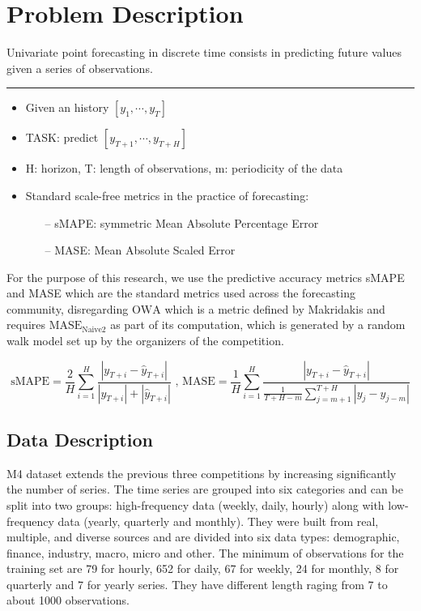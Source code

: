 \documentclass{article}
\begin{document}
\section{Problem Description}
\label{problemdescription}
Univariate point forecasting in discrete time consists in predicting future values given a series of observations.
\par\noindent\rule{\textwidth}{0.4pt}
\begin{itemize}
	\item Given an history $[ y_1, \cdots, y_T ]$
	\item TASK: predict $[y_{T+1}, \cdots , y_{T+H} ]$
	\item H: horizon, T: length of observations, m: periodicity of the data
	\item Standard scale-free metrics in the practice of forecasting:
	\begin{itemize}
			\item [--]  sMAPE: symmetric Mean Absolute Percentage Error
			\item [--]  MASE: Mean Absolute Scaled Error
	\end{itemize}
\end{itemize}

For the purpose of this research, we use the predictive accuracy metrics sMAPE and MASE which are the standard metrics used across the forecasting community, 
disregarding $\text{OWA}$ which is a metric defined by Makridakis and requires $\text{MASE}_{\text{Naive2}}$  as part of its computation, which is generated by a random walk model set up by the organizers of the competition.

\[
	\text{sMAPE} = \frac{2}{H}  \sum_{i=1}^{H} \frac{ | y_{T+i}  - \hat{y}_{T+i} | } { | y_{T+i} | + | \hat{y}_{T+i} | } \text{ ,     } 
	\text{MASE} = \frac{1}{H}  \sum_{i=1}^{H} \frac{ | y_{T+i}  - \hat{y}_{T+i} | } { \frac{1} {T + H - m} \sum_{j=m+1}^{T+H}  | y_j  - y_{j-m} | }
\]



\subsection{Data Description}
\label{datadescription}

M4 dataset extends the previous three competitions by increasing significantly the number of series. The time series are grouped into six categories and can be split into two groups: 
high-frequency data (weekly, daily, hourly) along with low-frequency data (yearly, quarterly and monthly).  They were built from real, multiple, and diverse sources and are divided into six data types:
demographic, finance, industry, macro, micro and other. The minimum of observations for the training set are 79 for hourly, 652 for daily, 67 for weekly, 24 for monthly, 8 for quarterly and 7 for yearly series.
They have different length raging from 7 to about 1000 observations.
\end{document}
